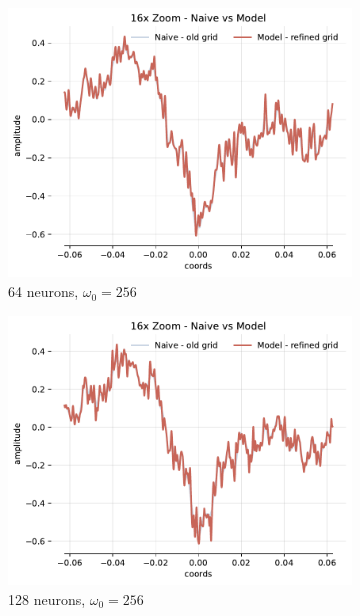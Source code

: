 \begin{figure}[h]
    \begin{subfigure}[b]{0.32\textwidth}
        \centering
        \includegraphics[width=\textwidth]{img/ch4/16x-zoom-1hl-64hf-256hz.pdf}
        \caption{64 neurons, $\omega_0=256$}
        \label{fig:16x-zoom-1hl-64hf-256hz}
    \end{subfigure}
    \begin{subfigure}[b]{0.32\textwidth}
        \centering
        \includegraphics[width=\textwidth]{img/ch4/16x-zoom-1hl-128hf-256hz.pdf}
        \caption{128 neurons, $\omega_0=256$}
        \label{fig:16x-zoom-1hl-128hf-256hz}
    \end{subfigure}
    \begin{subfigure}[b]{0.32\textwidth}

\end{subfigure}
\end{figure}
